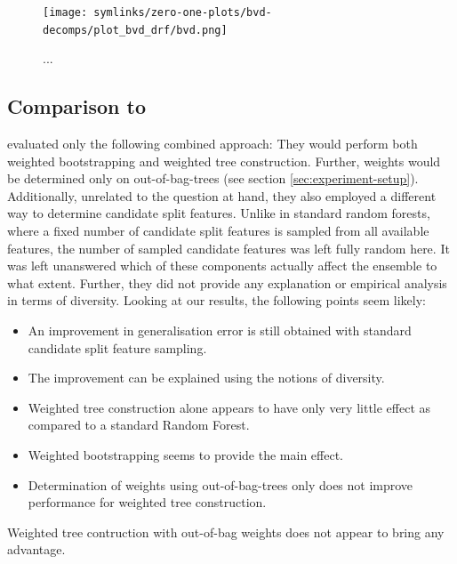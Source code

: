 \documentclass[
	twoside=false, %
]{kaobook}
\begin{document}
\begin{figure}
    \texttt{[image: symlinks/zero-one-plots/bvd-decomps/plot\_bvd\_drf/bvd.png]}
    \caption{
        ...
    }
    \label{fig:plot_bvd_drf}
\end{figure}

\subsection{Comparison to \cite{bernard_DynamicRandomForests_2012}} 
\label{sec:comparison-to-bernard-drf}
\citeauthor{bernard_DynamicRandomForests_2012} evaluated only the following combined approach: They would perform both weighted bootstrapping and weighted tree construction. Further, weights would be determined only on out-of-bag-trees (see section \ref{sec:experiment-setup}). Additionally, unrelated to the question at hand, they also employed a different way to determine candidate split features. Unlike in standard random forests, where a fixed number of candidate split features is sampled from all available features, the number of sampled candidate features was left fully random here. It was left unanswered which of these components actually affect the ensemble to what extent. Further, they did not provide any explanation or empirical analysis in terms of diversity.
Looking at our results, the following points seem likely:
\begin{itemize}
    \item An improvement in generalisation error is still obtained with standard candidate split feature sampling.
    \item The improvement can be explained using the notions of diversity.
    \item Weighted tree construction alone appears to have only very little effect as compared to a standard Random Forest.
    \item Weighted bootstrapping seems to provide the main effect.
    \item Determination of weights using out-of-bag-trees only does not improve performance for weighted tree construction. 
\end{itemize}
Weighted tree contruction with out-of-bag weights does not appear to bring any advantage.
\end{document}
